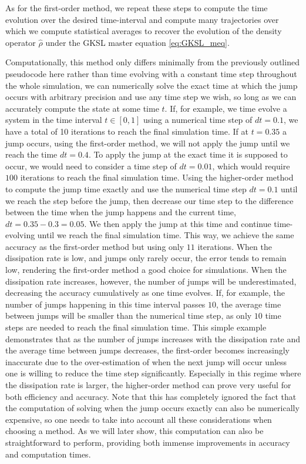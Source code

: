 As for the first-order method, we repeat these steps to compute the time evolution over the desired time-interval and compute many trajectories over which we compute statistical averages to recover the evolution of the density operator $\hat{\rho}$ under the GKSL master equation \ref{eq:GKSL_meq}. 

Computationally, this method only differs minimally from the previously outlined pseudocode here rather than time evolving with a constant time step throughout the whole simulation, we can numerically solve the exact time at which the jump occurs with arbitrary precision and use any time step we wish, so long as we can accurately compute the state at some time $t$. If, for example, we time evolve a system in the time interval $t\in[0,1]$ using a numerical time step of $dt=0.1$, we have a total of 10 iterations to reach the final simulation time. If at $t=0.35$ a jump occurs, using the first-order method, we will not apply the jump until we reach the time $dt=0.4$. To apply the jump at the exact time it is supposed to occur, we would need to consider a time step of $dt=0.01$, which would require $100$ iterations to reach the final simulation time. Using the higher-order method to compute the jump time exactly and use the numerical time step $dt=0.1$ until we reach the step before the jump, then decrease our time step to the difference between the time when the jump happens and the current time, $dt=0.35-0.3=0.05$. We then apply the jump at this time and continue time-evolving until we reach the final simulation time. This way, we achieve the same accuracy as the first-order method but using only $11$ iterations. When the dissipation rate is low, and jumps only rarely occur, the error tends to remain low, rendering the first-order method a good choice for simulations. When the dissipation rate increases, however, the number of jumps will be underestimated, decreasing the accuracy cumulatively as one time evolves. If, for example, the number of jumps happening in this time interval passes $10$, the average time between jumps will be smaller than the numerical time step, as only $10$ time steps are needed to reach the final simulation time. This simple example demonstrates that as the number of jumps increases with the dissipation rate and the average time between jumps decreases, the first-order becomes increasingly inaccurate due to the over-estimation of when the next jump will occur unless one is willing to reduce the time step significantly. Especially in this regime where the dissipation rate is larger, the higher-order method can prove very useful for both efficiency and accuracy. Note that this has completely ignored the fact that the computation of solving when the jump occurs exactly can also be numerically expensive, so one needs to take into account all these considerations when choosing a method. As we will later show, this computation can also be straightforward to perform, providing both immense improvements in accuracy and computation times.

